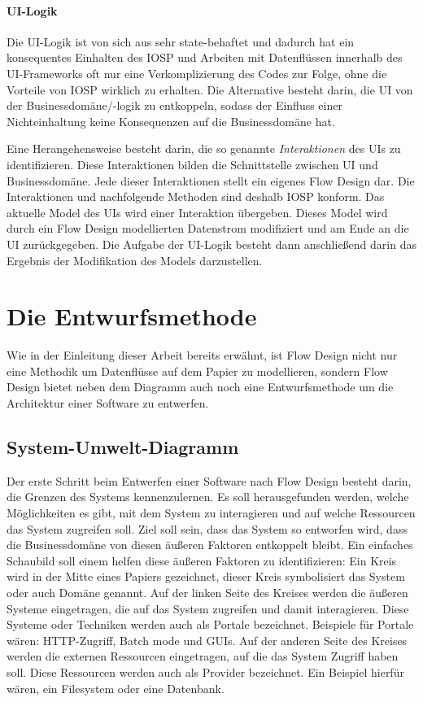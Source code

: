 \subsubsection{UI-Logik}

Die UI-Logik ist von sich aus sehr state-behaftet und dadurch hat ein
konsequentes Einhalten des IOSP und Arbeiten mit Datenflüssen innerhalb des UI-Frameworks oft nur eine
Verkomplizierung des Codes zur Folge, ohne die Vorteile von IOSP wirklich zu
erhalten. Die Alternative besteht darin, die UI von der Businessdomäne/-logik zu
entkoppeln, sodass der Einfluss einer Nichteinhaltung keine Konsequenzen auf
die Businessdomäne hat.

Eine Herangehensweise besteht darin, die so genannte \emph{Interaktionen} des
UIs zu identifizieren. Diese Interaktionen bilden  die Schnittstelle
zwischen UI und Businessdomäne. Jede dieser Interaktionen stellt ein eigenes
Flow Design dar. Die Interaktionen und nachfolgende Methoden sind deshalb IOSP
konform. Das aktuelle Model des UIs wird einer Interaktion übergeben.
Dieses Model wird durch ein Flow Design modellierten Datenstrom modifiziert und am
Ende an die UI zurückgegeben. 
Die Aufgabe der UI-Logik besteht dann anschließend darin das Ergebnis der Modifikation des Models darzustellen.






\chapter{Die Entwurfsmethode}

Wie in der Einleitung dieser Arbeit bereits erwähnt, ist Flow Design nicht nur
eine Methodik um Datenflüsse auf dem Papier zu modellieren, sondern Flow Design
bietet neben dem Diagramm auch noch eine Entwurfsmethode um die Architektur einer Software
zu entwerfen.

\section{System-Umwelt-Diagramm}

Der erste Schritt beim Entwerfen einer Software nach Flow Design besteht
darin, die Grenzen des Systems kennenzulernen. Es soll herausgefunden
werden, welche Möglichkeiten es gibt, mit dem System zu interagieren und auf
welche Ressourcen das System zugreifen soll. Ziel soll sein, dass das System
so entworfen wird, dass die Businessdomäne von diesen äußeren Faktoren entkoppelt bleibt.
Ein einfaches Schaubild soll einem helfen diese äußeren Faktoren zu
identifizieren: Ein Kreis wird in der Mitte eines Papiers gezeichnet, dieser
Kreis symbolisiert das System oder auch Domäne genannt.
Auf der linken Seite des Kreises werden die äußeren Systeme eingetragen, die
auf das System zugreifen und damit interagieren. Diese Systeme oder
Techniken werden auch als Portale bezeichnet. Beispiele für Portale wären:
HTTP-Zugriff, Batch mode und GUIs.
Auf der anderen Seite des Kreises werden die externen Ressourcen eingetragen, auf die
das System Zugriff haben soll. Diese Ressourcen werden auch als Provider
bezeichnet. Ein Beispiel hierfür wären, ein Filesystem oder eine Datenbank.

